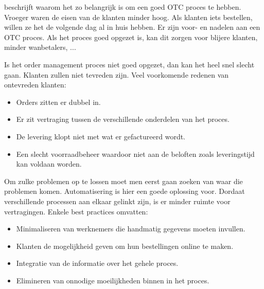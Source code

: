 \textcite{PEARSON2017} beschrijft waarom het zo belangrijk is om een goed OTC proces te hebben. Vroeger waren de eisen van de klanten minder hoog. Als klanten iets bestellen, willen ze het de volgende dag al in huis hebben. Er zijn voor- en nadelen aan een OTC proces. Als het proces goed opgezet is, kan dit zorgen voor blijere klanten, minder wanbetalers, ... 

Is het order management proces niet goed opgezet, dan kan het heel snel slecht gaan. Klanten zullen niet tevreden zijn. 
Veel voorkomende redenen van ontevreden klanten:
\begin{itemize}
	\item Orders zitten er dubbel in.
	\item Er zit vertraging tussen de verschillende onderdelen van het proces.
	\item De levering klopt niet met wat er gefactureerd wordt.
	\item Een slecht voorraadbeheer waardoor niet aan de beloften zoals leveringstijd kan voldaan worden.
\end{itemize}
Om zulke problemen op te lossen moet men eerst gaan zoeken van waar die problemen komen. Automatisering is hier een goede oplossing voor. Dordaat verschillende processen aan elkaar gelinkt zijn, is er minder ruimte voor vertragingen. Enkele best practices omvatten:
\begin{itemize}
	\item Minimaliseren van  werknemers die handmatig gegevens moeten invullen.
	\item Klanten de mogelijkheid geven om hun bestellingen online te maken.
	\item Integratie van de informatie over het gehele proces.
	\item Elimineren van onnodige moeilijkheden binnen in het proces.
\end{itemize}

